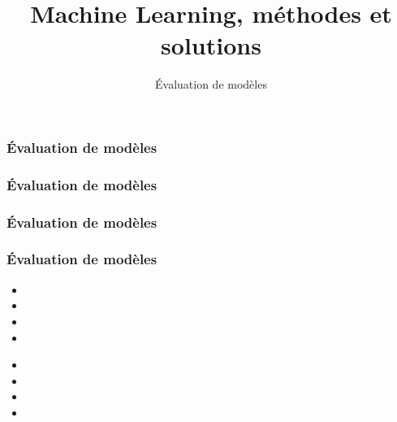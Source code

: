\documentclass{formation}
\title{Machine Learning, méthodes et solutions}
\subtitle{Évaluation de modèles}
\begin{document}
\maketitle

\begin{frame}
  \frametitle{Évaluation de modèles}
\end{frame}

\begin{frame}
  \frametitle{Évaluation de modèles}
  
\end{frame}

\begin{frame}
  \frametitle{Évaluation de modèles}
\end{frame}

\begin{frame}
  \frametitle{Évaluation de modèles}

  
  \begin{itemize}
  \item 
  \item 
  \item 
  \item 
  \end{itemize}

  \begin{minipage}[l]{0.49\linewidth}
  \end{minipage}\hfill
  \begin{minipage}[l]{0.49\linewidth}
  \end{minipage}\hfill

  \begin{minipage}[l]{0.49\linewidth}
      \begin{itemize}
      \item 
      \item 
      \item 
      \item 
      \end{itemize}
  \end{minipage}\hfill
  \begin{minipage}[l]{0.49\linewidth}
  \end{minipage}\hfill

\end{frame}
\end{document}
